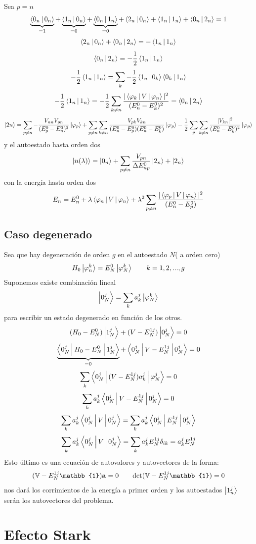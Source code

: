 \documentclass[10pt,oneside]{CBFT_book}
\begin{document}
Sea $p=n$
\[
	\underbrace{\Braket{0_n|0_n}}_{=1} + \underbrace{\Braket{1_n|0_n}}_{=0} +
	\underbrace{\Braket{0_n|1_n}}_{=0} +
	\Braket{2_n|0_n} + \Braket{1_n|1_n} + \Braket{0_n|2_n} = 1
\]
\[
	\Braket{2_n|0_n} + \Braket{0_n|2_n}  = - \Braket{1_n|1_n}
\]
\[
	 \Braket{0_n|2_n} = -\frac{1}{2}  \Braket{1_n|1_n} 
\]
\[
	 -\frac{1}{2}\Braket{1_n|1_n} = \sum_{k} -\frac{1}{2}\Braket{1_n|0_k}\Braket{0_k|1_n}
\]
\[
	-\frac{1}{2}\Braket{1_n|1_n} = -\frac{1}{2} \sum_{k\neq n} 
	\frac{|\Braket{\varphi_k|V|\varphi_n}|^2}{( E_n^0 - E_k^0 )^2} = \Braket{0_n|2_n}
\]
\[
	\Ket{2n} = \sum_{p\neq n} -\frac{V_{nn}V_{pn}}{(E_p^0 - E_n^0)^2} \Ket{\varphi_p} +
	\sum_{p\neq n}\sum_{k\neq n} \frac{V_{pk}V_{kn}}{(E_n^0 - E_p^0)(E_n^0 - E_k^0)} \Ket{\varphi_p} -
		\frac{1}{2}\sum_p\sum_{k\neq n} \frac{|V_{kn}|^2}{(E_n^0 - E_k^0)^2}\Ket{\varphi_p} 
\]
y el autoestado hasta orden dos
\[
	\Ket{n(\lambda)} = \Ket{0_n} + \sum_{p\neq n} \frac{V_{pn}}{\Delta E_{np}^0} \Ket{2_n} + \Ket{2_n} 
\]
con la energía hasta orden dos 
\[
	E_n = E_n^0 + \lambda\Braket{\varphi_n|V|\varphi_n} + \lambda^2 \sum_{p\neq n} 
		\frac{|\Braket{\varphi_p|V|\varphi_n}|^2}{( E_n^0 - E_p^0 )}
\]

\subsection{Caso degenerado}

Sea que hay degeneración de orden $g$ en el autoestado $N$( a orden cero)
\[
	H_0 \Ket{\varphi_n^k} = E_N^0 \Ket{\varphi_N^k} \qquad k=1,2,...,g
\]
Suponemos existe combinación lineal 
\[
	\Ket{0_N^j} = \sum_k a_k^j \Ket{\varphi_N^k}
\]
para escribir un estado degenerado en función de los otros.
\[
	(H_0 - E_N^0 )\Ket{1_N^j} + (V-E_N^{1 j})\Ket{0_N^j} = 0
\]
\[
	\underbrace{\Braket{0_N^j|H_0 - E_N^0|1_N^j}}_{=0} + \Braket{0_N^j|V-E_N^{1 j}|0_N^j} = 0
\]
\[
	\sum_k \Braket{0_N^j|(V-E_N^{1 j})a_k^j|\varphi_N^j} = 0
\]
\[
	\sum_k a_k^j\Braket{0_N^j|V-E_N^{1 j}|0_N^j} = 0
\]
\[
	\sum_k a_k^j\Braket{0_N^j|V|0_N^j} = \sum_k a_k^j\Braket{0_N^j|E_N^{1 j}|0_N^j}
\]
\[
	\sum_k a_k^j\Braket{0_N^j|V|0_N^j} = \sum_k a_k^j E_N^{1 j} \delta_{ik} = a_k^j E_N^{1 j}
\]
Esto último es una ecuación de autovalores y autovectores de la forma:
\[
	(\mathbb{V} - E_N^{1 j} \mathbb{1})\vb{a} = 0 \qquad \mathrm{det}(\mathbb{V} - E_N^{1 j} \mathbb{1})=0
\]
nos dará los corrimientos de la energía a primer orden  y los autoestados $\Ket{1_n^j}$ serán los 
autovectores del problema.

\section{Efecto Stark}
\end{document}
